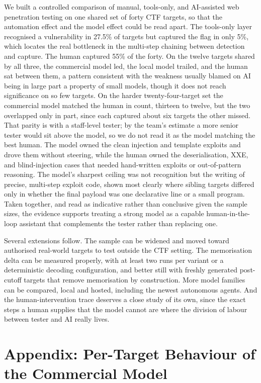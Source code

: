 \documentclass[11pt]{article}
\begin{document}
We built a controlled comparison of manual, tools-only, and AI-assisted web penetration testing on one shared set of forty CTF targets, so that the automation effect and the model effect could be read apart. The tools-only layer recognised a vulnerability in 27.5\% of targets but captured the flag in only 5\%, which locates the real bottleneck in the multi-step chaining between detection and capture. The human captured 55\% of the forty. On the twelve targets shared by all three, the commercial model led, the local model trailed, and the human sat between them, a pattern consistent with the weakness usually blamed on AI being in large part a property of small models, though it does not reach significance on so few targets. On the harder twenty-four-target set the commercial model matched the human in count, thirteen to twelve, but the two overlapped only in part, since each captured about six targets the other missed. That parity is with a staff-level tester; by the team's estimate a more senior tester would sit above the model, so we do not read it as the model matching the best human. The model owned the clean injection and template exploits and drove them without steering, while the human owned the deserialisation, XXE, and blind-injection cases that needed hand-written exploits or out-of-pattern reasoning. The model's sharpest ceiling was not recognition but the writing of precise, multi-step exploit code, shown most clearly where sibling targets differed only in whether the final payload was one declarative line or a small program. Taken together, and read as indicative rather than conclusive given the sample sizes, the evidence supports treating a strong model as a capable human-in-the-loop assistant that complements the tester rather than replacing one.

Several extensions follow. The sample can be widened and moved toward authorised real-world targets to test outside the CTF setting. The memorisation delta can be measured properly, with at least two runs per variant or a deterministic decoding configuration, and better still with freshly generated post-cutoff targets that remove memorisation by construction. More model families can be compared, local and hosted, including the newest autonomous agents. And the human-intervention trace deserves a close study of its own, since the exact steps a human supplies that the model cannot are where the division of labour between tester and AI really lives.

\section*{Appendix: Per-Target Behaviour of the Commercial Model}
\end{document}
